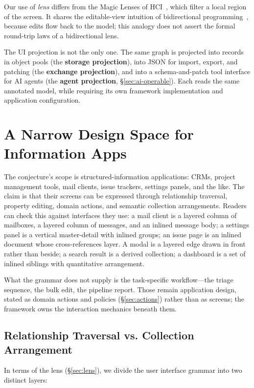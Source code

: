 \documentclass[sigplan,review,anonymous,10pt]{acmart}
\begin{document}
Our use of \emph{lens} differs from the Magic Lenses of HCI~\cite{bier1993}, which filter a local region of the screen. It shares the editable-view intuition of bidirectional programming~\cite{foster2007}, because edits flow back to the model; this analogy does not assert the formal round-trip laws of a bidirectional lens.

The UI projection is not the only one. The same graph is projected into records in object pools (the \textbf{storage projection}), into JSON for import, export, and patching (the \textbf{exchange projection}), and into a schema-and-patch tool interface for AI agents (the \textbf{agent projection}, \S\ref{sec:ai-operable}). Each reads the same annotated model, while requiring its own framework implementation and application configuration.

\section{A Narrow Design Space for Information Apps}
\label{sec:narrow}

The conjecture's scope is structured-information applications: CRMs, project management tools, mail clients, issue trackers, settings panels, and the like. The claim is that their screens can be expressed through relationship traversal, property editing, domain actions, and semantic collection arrangements. Readers can check this against interfaces they use: a mail client is a layered column of mailboxes, a layered column of messages, and an inlined message body; a settings panel is a vertical master-detail with inlined groups; an issue page is an inlined document whose cross-references layer. A modal is a layered edge drawn in front rather than beside; a search result is a derived collection; a dashboard is a set of inlined siblings with quantitative arrangement.

What the grammar does not supply is the task-specific workflow---the triage sequence, the bulk edit, the pipeline report. Those remain application design, stated as domain actions and policies (\S\ref{sec:actions}) rather than as screens; the framework owns the interaction mechanics beneath them.

\subsection{Relationship Traversal vs. Collection Arrangement}
\label{sec:traversal-arrangement}

In terms of the lens (\S\ref{sec:lens}), we divide the user interface grammar into two distinct layers:
\end{document}
